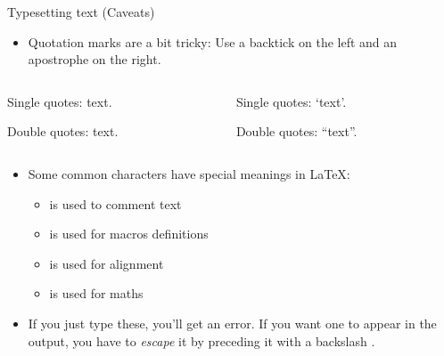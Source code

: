 \documentclass[,aspectratio=43]{beamer}
\newenvironment{Shaded}{\begin{snugshade}}{\end{snugshade}}
\newcommand{\NormalTok}[1]{#1}
\providecommand{\tightlist}{%
  \setlength{\itemsep}{0pt}\setlength{\parskip}{0pt}}
\begin{document}
\begin{frame}[fragile]{Typesetting text (Caveats)}
\protect\hypertarget{typesetting-text-caveats}{}
\begin{itemize}
\tightlist
\item
  Quotation marks are a bit tricky: Use a backtick 
  on the left and an apostrophe  on the right.
\end{itemize}

\begin{columns}[T]
\begin{column}{0.48\textwidth}
\vspace{-1em}

\begin{Shaded}
\begin{Highlighting}[]
\NormalTok{Single quotes: \textasciigrave{}text\textquotesingle{}.}

\NormalTok{Double quotes: \textasciigrave{}\textasciigrave{}text\textquotesingle{}\textquotesingle{}.}
\end{Highlighting}
\end{Shaded}
\end{column}

\begin{column}{0.48\textwidth}
Single quotes: `text'.

\vspace{1.2em}

Double quotes: ``text''.
\end{column}
\end{columns}

\vspace{0.5em}

\begin{itemize}
\item
  Some common characters have special meanings in \LaTeX :

  \begin{itemize}
  \tightlist
  \item
    \framebox{\texttt{\%}} is used to comment text
  \item
    \framebox{\texttt{\#}} is used for macros definitions
  \item
    \framebox{\texttt{\&}} is used for alignment
  \item
    \framebox{\texttt{\$}} is used for maths
  \end{itemize}
\item
  If you just type these, you'll get an error. If you want one to appear
  in the output, you have to \emph{escape} it by preceding it with a
  backslash \framebox{\texttt{\textbackslash}}.
\end{itemize}


\end{frame}
\end{document}
